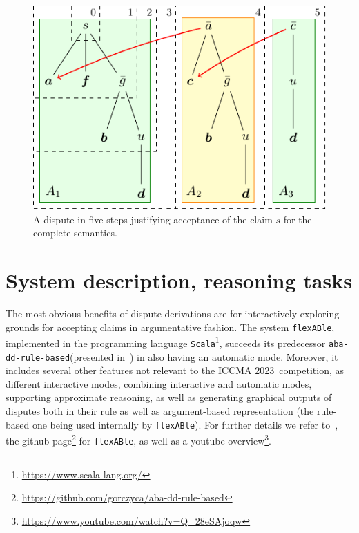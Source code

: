 \documentclass[conference]{IEEEtran}
\newcommand{\abaddrule}{\texttt{aba-dd-rule-based}\xspace}
\newcommand{\flexable}{\texttt{flexABle}\xspace}
\newcommand{\scala}{\texttt{Scala}\xspace}
\newcommand{\iccma}{ICCMA 2023}
\begin{document}
\begin{figure}
    \centering
      \centering
      \includegraphics[scale=0.8]{diagrams/diagram.pdf}
      \caption{A dispute in five steps justifying acceptance of the claim $s$ for the complete semantics.}

    \label{fig:diagrams}
  \end{figure}




\section{System description, reasoning tasks}

The most obvious benefits of dispute derivations are for interactively exploring grounds for accepting claims in argumentative fashion.  %
The system \flexable, implemented in the programming language \scala\footnote{\url{https://www.scala-lang.org/}}, succeeds its predecessor \abaddrule (presented in~\cite{DillerGG21}) in also having an automatic mode. Moreover, it includes several other features not relevant to the \iccma~competition, as different interactive modes, combining interactive and automatic modes, supporting approximate reasoning, as well as generating graphical outputs of disputes both in their rule as well as argument-based representation (the rule-based one being used internally by \flexable).  For further details we refer to~\cite{gor22}, the github page\footnote{\url{https://github.com/gorczyca/aba-dd-rule-based}} for \flexable, as well as a youtube overview\footnote{\url{https://www.youtube.com/watch?v=Q_28eSAjoqw}}.
\end{document}
